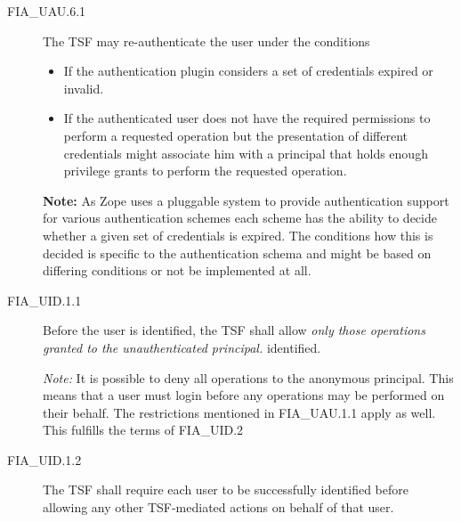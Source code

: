 \documentclass[12pt,english]{scrbook}
\begin{document}
\begin{description}

\item[FIA{\_}UAU.6.1 ]


The TSF may re-authenticate the user under the conditions
\begin{itemize}
\item {} 
If the authentication plugin considers a set of credentials expired or invalid.

\item {} 
If the authenticated user does not have the required permissions to
perform a requested operation but the presentation of different
credentials might associate him with a principal that holds enough
privilege grants to perform the requested operation.

\end{itemize}

\textbf{Note:} As Zope uses a pluggable system to provide authentication
support for various authentication schemes each scheme has the ability to
decide whether a given set of credentials is expired. The conditions how this
is decided is specific to the authentication schema and might be based on
differing conditions or not be implemented at all.

\end{description}


\begin{description}

\item[FIA{\_}UID.1.1 ]

Before the user is identified, the TSF shall allow \emph{only those operations
granted to the unauthenticated principal.}
identified.

\emph{Note:} It is possible to deny all operations to the anonymous
principal. This means that a user must login before any operations may
be performed on their behalf. The restrictions mentioned in FIA\_UAU.1.1 apply
as well.  This fulfills the terms of FIA\_UID.2


\item[FIA{\_}UID.1.2 ]


The TSF shall require each user to be successfully
identified before allowing any other TSF-mediated actions on behalf
of that user.



\end{description}
\end{document}
